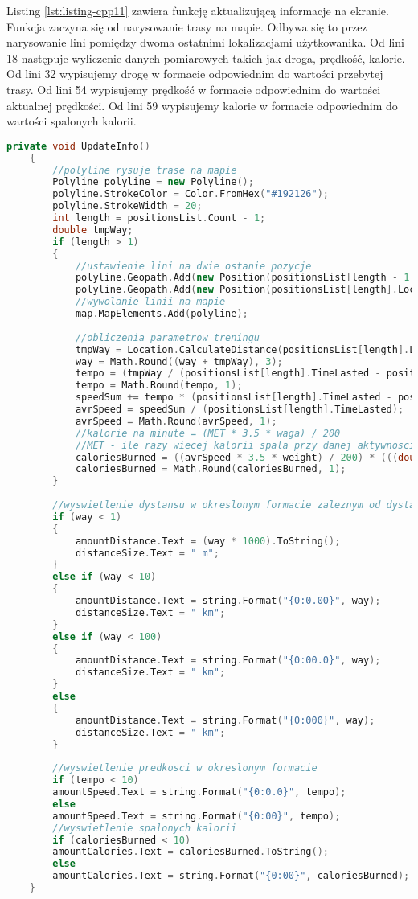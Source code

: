 Listing \ref{lst:listing-cpp11} zawiera funkcję aktualizującą informacje na ekranie. Funkcja zaczyna się od narysowanie trasy na mapie. Odbywa się to przez narysowanie lini pomiędzy dwoma ostatnimi lokalizacjami użytkowanika. Od lini 18 następuje wyliczenie danych pomiarowych takich jak droga, prędkość, kalorie. Od lini 32 wypisujemy drogę w formacie odpowiednim do wartości przebytej trasy. Od lini 54 wypisujemy prędkość w formacie odpowiednim do wartości aktualnej prędkości. Od lini 59 wypisujemy kalorie w formacie odpowiednim do wartości spalonych kalorii. 
\begin{lstlisting}[caption=Aktualizowanie informacji na ekranie, label={lst:listing-cpp11}, language=C++]
	 private void UpdateInfo()
	{
		//polyline rysuje trase na mapie
		Polyline polyline = new Polyline();
		polyline.StrokeColor = Color.FromHex("#192126");
		polyline.StrokeWidth = 20;
		int length = positionsList.Count - 1;
		double tmpWay;
		if (length > 1)
		{
			//ustawienie lini na dwie ostanie pozycje
			polyline.Geopath.Add(new Position(positionsList[length - 1].Location.Latitude, positionsList[length - 1].Location.Longitude));
			polyline.Geopath.Add(new Position(positionsList[length].Location.Latitude, positionsList[length].Location.Longitude));
			//wywolanie linii na mapie
			map.MapElements.Add(polyline);
			
			//obliczenia parametrow treningu
			tmpWay = Location.CalculateDistance(positionsList[length].Location, positionsList[length - 1].Location, DistanceUnits.Kilometers);
			way = Math.Round((way + tmpWay), 3);
			tempo = (tmpWay / (positionsList[length].TimeLasted - positionsList[length - 1].TimeLasted)) * 3600;
			tempo = Math.Round(tempo, 1);
			speedSum += tempo * (positionsList[length].TimeLasted - positionsList[length - 1].TimeLasted);
			avrSpeed = speedSum / (positionsList[length].TimeLasted);
			avrSpeed = Math.Round(avrSpeed, 1);
			//kalorie na minute = (MET * 3.5 * waga) / 200
			//MET - ile razy wiecej kalorii spala przy danej aktywnosci w porowaniu do odpoczynku
			caloriesBurned = ((avrSpeed * 3.5 * weight) / 200) * (((double)positionsList[length].TimeLasted) / 60);
			caloriesBurned = Math.Round(caloriesBurned, 1);
		}
		
		//wyswietlenie dystansu w okreslonym formacie zaleznym od dystansu
		if (way < 1)
		{
			amountDistance.Text = (way * 1000).ToString();
			distanceSize.Text = " m";
		}
		else if (way < 10)
		{
			amountDistance.Text = string.Format("{0:0.00}", way);
			distanceSize.Text = " km";
		}
		else if (way < 100)
		{
			amountDistance.Text = string.Format("{0:00.0}", way);
			distanceSize.Text = " km";
		}
		else
		{
			amountDistance.Text = string.Format("{0:000}", way);
			distanceSize.Text = " km";
		}
		
		//wyswietlenie predkosci w okreslonym formacie
		if (tempo < 10)
		amountSpeed.Text = string.Format("{0:0.0}", tempo);
		else
		amountSpeed.Text = string.Format("{0:00}", tempo);
		//wyswietlenie spalonych kalorii
		if (caloriesBurned < 10)
		amountCalories.Text = caloriesBurned.ToString();
		else
		amountCalories.Text = string.Format("{0:00}", caloriesBurned);
	}
\end{lstlisting}

